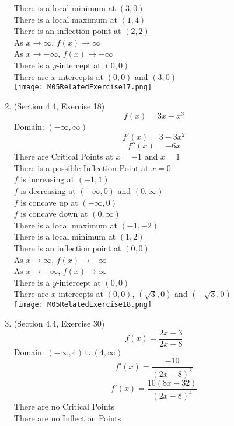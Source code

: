 \documentclass{article}
\begin{document}
\begin{enumerate}
        There is a local minimum at $(3, 0)$ \\
        There is a local maximum at $(1, 4)$ \\
        There is an inflection point at $(2, 2)$ \\
        As $x \to \infty$, $f(x) \to \infty$ \\
        As $x \to -\infty$, $f(x) \to -\infty$ \\
        There is a $y$-intercept at $(0, 0)$ \\
        There are $x$-intercepts at $(0, 0)$ and $(3, 0)$ \\
        \texttt{[image: M05RelatedExercise17.png]}
    \item (Section 4.4, Exercise 18)
        $$f(x) = 3x - x^3$$
        Domain: $(-\infty, \infty)$
        $$f'(x) = 3 - 3x^2$$
        $$f''(x) = - 6x$$
        There are Critical Points at $x = -1$ and $x = 1$ \\
        There is a possible Inflection Point at $x = 0$ \\
        $f$ is increasing at $(-1, 1)$ \\
        $f$ is decreasing at $(-\infty, 0)$ and $(0, \infty)$ \\
        $f$ is concave up at $(-\infty, 0)$ \\
        $f$ is concave down at $(0, \infty)$ \\
        There is a local maximum at $(-1, -2)$ \\
        There is a local minimum at $(1, 2)$ \\
        There is an inflection point at $(0, 0)$ \\
        As $x \to \infty$, $f(x) \to -\infty$ \\
        As $x \to -\infty$, $f(x) \to \infty$ \\
        There is a $y$-intercept at $(0, 0)$ \\
        There are $x$-intercepts at $(0, 0)$, $\left(\sqrt{3}, 0\right)$ and $\left(-\sqrt{3}, 0\right)$ \\
        \texttt{[image: M05RelatedExercise18.png]}
    \item (Section 4.4, Exercise 30)
        $$f(x) = \frac{2x - 3}{2x - 8}$$
        Domain: $(-\infty, 4)\cup(4, \infty)$
        $$f'(x) = \frac{-10}{\left(2x - 8\right)^2}$$
        $$f'(x) = \frac{10(8x - 32)}{\left(2x - 8\right)^4}$$
        There are no Critical Points \\
        There are no Inflection Points \\

\end{enumerate}
\end{document}
